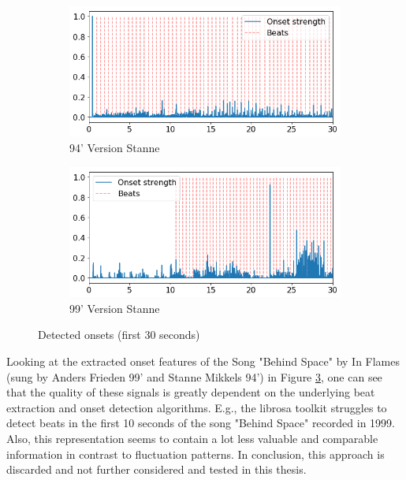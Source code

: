 \begin{figure}[htbp]
{{			\begin{subfigure}{.495\textwidth}
				\centering    
				\includegraphics[scale=0.3]{Images/Beat/s_s_on.png}
				\caption{94' Version Stanne}
				\label{saon}
			\end{subfigure}		
			\begin{subfigure}{.495\textwidth}
				\centering     
				\includegraphics[scale=0.3]{Images/Beat/s_a_on.png}
				\caption{99' Version Stanne}
				\label{sson}
			\end{subfigure}%
				
	}}
	\caption{Detected onsets (first 30 seconds)}
	\label{fig:ons1}
\end{figure}	

\noindent Looking at the extracted onset features of the Song "Behind Space" by In Flames (sung by Anders Frieden 99' and Stanne Mikkels 94') in Figure \ref{fig:ons1}, one can see that the quality of these signals is greatly dependent on the underlying beat extraction and onset detection algorithms. E.g., the librosa toolkit struggles to detect beats in the first 10 seconds of the song "Behind Space" recorded in 1999. Also, this representation seems to contain a lot less valuable and comparable information in contrast to fluctuation patterns. In conclusion, this approach is discarded and not further considered and tested in this thesis.  

